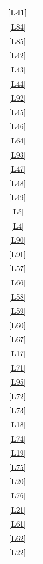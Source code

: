 \begin{longtable}{|c|c|}
	\hline \ref{L41} & \si \\ %
	\hline \ref{L84} & \si \\
	\hline \ref{L85} & \si \\
	\hline \ref{L42} & \si \\
	\hline \ref{L43} & \no \\
	\hline \ref{L44} & \si \\ %
	\hline \ref{L92} & \si \\
	\hline \ref{L45} & \si \\
	\hline \ref{L46} & \si \\
	\hline \ref{L64} & \si  \\
	\hline \ref{L93} & \si \\ %
	\hline \ref{L47} & \no \\
	\hline \ref{L48} & \no  \\
	\hline \ref{L49} & \no  \\
	\hline \ref{L3} & \si \\
	\hline \ref{L4} & \si \\ %
	\hline \ref{L90} & \si \\
	\hline \ref{L91} & \no \\	
	\hline \ref{L57} & \si \\
	\hline \ref{L66} & \no \\
	\hline \ref{L58} & \si \\ %
	\hline \ref{L59} & \si \\
	\hline \ref{L60} & \si \\
	\hline \ref{L67} & \no \\
	\hline \ref{L17} & \si \\
	\hline \ref{L71} & \si \\ %
	\hline \ref{L95} & \si \\
	\hline \ref{L72} & \si \\
	\hline \ref{L73} & \si \\
	\hline \ref{L18} & \si \\
	\hline \ref{L74} & \si \\ %
	\hline \ref{L19} & \si \\
	\hline \ref{L75} & \no \\
	\hline \ref{L20} & \no \\
	\hline \ref{L76} & \no \\	
	\hline \ref{L21} & \si \\ %
	\hline \ref{L61} & \si \\
	\hline \ref{L62} & \si \\
	\hline \ref{L22} & \si \\

\end{longtable}
